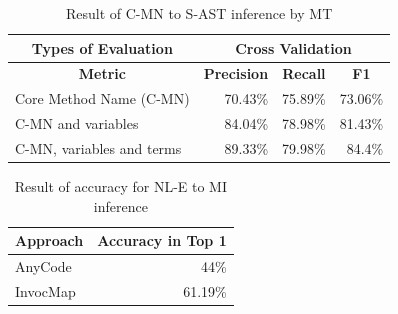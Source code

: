 \documentclass[sigconf,review,anonymous]{article}
\begin{document}
\begin{table}[]

\caption{Result of C-MN to S-AST inference by MT}
\label{tbl:Q3Result}

\centering
\begin{tabular}{|l|r|r|r|}
\hline
\multicolumn{1}{|c|}{\textbf{Types of Evaluation}} & \multicolumn{3}{c|}{\textbf{Cross Validation}}                                                                                             \\ \hline
\multicolumn{1}{|c|}{\textbf{Metric}}              & \multicolumn{1}{c|}{\textbf{Precision}} & \multicolumn{1}{c|}{\textbf{Recall}} & \multicolumn{1}{c|}{\textbf{F1}}  \\ \hline
Core Method Name (C-MN)                            & 70.43\%                                   & 75.89\%                                & 73.06\%                                                        \\ \hline
C-MN and variables                                 & 84.04\%                                   & 78.98\%                                & 81.43\%                                                      \\ \hline
C-MN, variables and terms                          & 89.33\%                                   & 79.98\%                                & 84.4\%                                                            \\ \hline
\end{tabular}
\end{table}


\begin{table}[]
\caption{Result of accuracy for NL-E to MI inference}
\label{tbl:Q4ResultAccuracy}
\centering
\begin{tabular}{|l|r|}
\hline
\multicolumn{1}{|c|}{\textbf{Approach}} & \multicolumn{1}{c|}{\textbf{Accuracy in Top 1}} \\ \hline
AnyCode                                 & 44\%                                            \\ \hline
InvocMap                                & 61.19\%                                         \\ \hline
\end{tabular}
\end{table}
\end{document}
